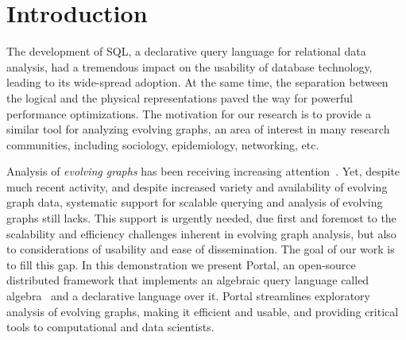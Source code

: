 \section{Introduction}
\label{sec:intro}

The development of SQL, a declarative query language for relational
data analysis, had a tremendous impact on the usability of database
technology, leading to its wide-spread adoption. At the same time, the
separation between the logical and the physical representations paved
the way for powerful performance optimizations. The motivation for our
research is to provide a similar tool for analyzing evolving graphs,
an area of interest in many research communities, including sociology,
epidemiology, networking, etc.





Analysis of {\em evolving graphs} has been receiving increasing
attention~\cite{DBLP:journals/csur/AggarwalS14,Miao2015,Ren2011,Semertzidis2015}.
Yet, despite much recent activity, and despite increased variety and
availability of evolving graph data, systematic support for scalable
querying and analysis of evolving graphs still lacks.  This support is
urgently needed, due first and foremost to the scalability and
efficiency challenges inherent in evolving graph analysis, but also to
considerations of usability and ease of dissemination.  The goal of
our work is to fill this gap.  In this demonstration we present
Portal, an open-source distributed framework that implements an
algebraic query language called \tg algebra~\cite{PortalarXiv2016} and
a declarative language over it. Portal streamlines exploratory
analysis of evolving graphs, making it efficient and usable, and
providing critical tools to computational and data scientists.

